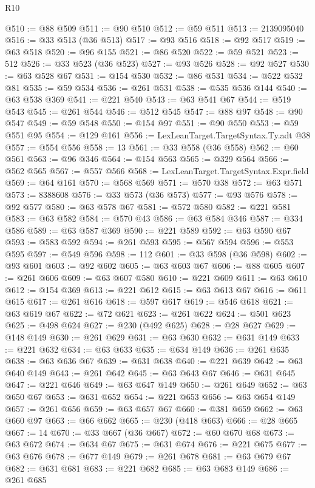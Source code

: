 \begin{lexlean}{R10}
\begin{coremodule}
@510 := @88 @509
@511 := @90 @510
@512 := @59 @511
@513 := 2139095040
@516 := @33 @513 (@36 @513)
@517 := @93 @516
@518 := @92 @517
@519 := @63 @518
@520 := @96 @155
@521 := @86 @520
@522 := @59 @521
@523 := 512
@526 := @33 @523 (@36 @523)
@527 := @93 @526
@528 := @92 @527
@530 := @63 @528 @67
@531 := @154 @530
@532 := @86 @531
@534 := @522 @532 @81
@535 := @59 @534
@536 := @261 @531
@538 := @535 @536 @144
@540 := @63 @538 @369
@541 := @221 @540
@543 := @63 @541 @67
@544 := @519 @543
@545 := @261 @544
@546 := @512 @545
@547 := @88 @97
@548 := @90 @547
@549 := @59 @548
@550 := @154 @97
@551 := @90 @550
@553 := @59 @551 @95
@554 := @129 @161
@556 := LexLeanTarget.TargetSyntax.Ty.adt @38
@557 := @554 @556
@558 := 13
@561 := @33 @558 (@36 @558)
@562 := @60 @561
@563 := @96 @346
@564 := @154 @563
@565 := @329 @564
@566 := @562 @565
@567 := @557 @566
@568 := LexLeanTarget.TargetSyntax.Expr.field
@569 := @64 @161
@570 := @568 @569
@571 := @570 @38
@572 := @63 @571
@573 := 8388608
@576 := @33 @573 (@36 @573)
@577 := @93 @576
@578 := @92 @577
@580 := @63 @578 @67
@581 := @572 @580
@582 := @221 @581
@583 := @63 @582
@584 := @570 @43
@586 := @63 @584 @346
@587 := @334 @586
@589 := @63 @587 @369
@590 := @221 @589
@592 := @63 @590 @67
@593 := @583 @592
@594 := @261 @593
@595 := @567 @594
@596 := @553 @595
@597 := @549 @596
@598 := 112
@601 := @33 @598 (@36 @598)
@602 := @93 @601
@603 := @92 @602
@605 := @63 @603 @67
@606 := @88 @605
@607 := @261 @606
@609 := @63 @607 @580
@610 := @221 @609
@611 := @63 @610
@612 := @154 @369
@613 := @221 @612
@615 := @63 @613 @67
@616 := @611 @615
@617 := @261 @616
@618 := @597 @617
@619 := @546 @618
@621 := @63 @619 @67
@622 := @72 @621
@623 := @261 @622
@624 := @501 @623
@625 := @498 @624
@627 := @230 (@492 @625)
@628 := @28 @627
@629 := @148 @149
@630 := @261 @629
@631 := @63 @630
@632 := @631 @149
@633 := @221 @632
@634 := @63 @633
@635 := @634 @149
@636 := @261 @635
@638 := @63 @636 @67
@639 := @631 @638
@640 := @221 @639
@642 := @63 @640 @149
@643 := @261 @642
@645 := @63 @643 @67
@646 := @631 @645
@647 := @221 @646
@649 := @63 @647 @149
@650 := @261 @649
@652 := @63 @650 @67
@653 := @631 @652
@654 := @221 @653
@656 := @63 @654 @149
@657 := @261 @656
@659 := @63 @657 @67
@660 := @381 @659
@662 := @63 @660 @97
@663 := @66 @662
@665 := @230 (@418 @663)
@666 := @28 @665
@667 := 14
@670 := @33 @667 (@36 @667)
@672 := @60 @670 @68
@673 := @63 @672
@674 := @634 @67
@675 := @631 @674
@676 := @221 @675
@677 := @63 @676
@678 := @677 @149
@679 := @261 @678
@681 := @63 @679 @67
@682 := @631 @681
@683 := @221 @682
@685 := @63 @683 @149
@686 := @261 @685

\end{coremodule}
\end{lexlean}
